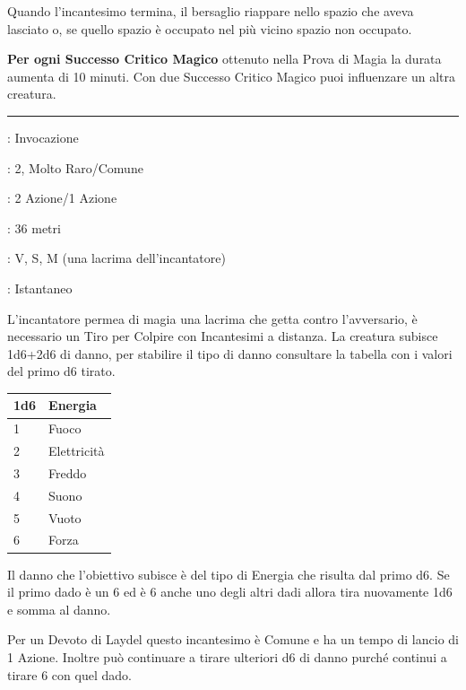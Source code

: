 \begin{multicols}{2}
Quando l'incantesimo termina, il bersaglio riappare nello spazio che aveva lasciato o, se quello spazio è occupato nel più vicino spazio non occupato.

\textbf{Per ogni Successo Critico Magico} ottenuto nella Prova di Magia la durata aumenta di 10 minuti. Con due Successo Critico Magico puoi influenzare un altra creatura.

\smallskip\noindent\rule{\linewidth}{2pt} \hypertarget{Lacrima di Laydel}{}\smallskip{}
\noindent
\begin{description}[noitemsep, topsep=0pt, parsep=0pt, partopsep=0pt, leftmargin=0cm, labelwidth=2.8cm]
	\item[\textbf{Lista di Magia}]: Invocazione
	\item[\textbf{Livello}]: 2, Molto Raro/Comune
	\item[\textbf{T. di Lancio}]: 2 Azione/1 Azione
	\item[\textbf{Gittata}]: 36 metri
	\item[\textbf{Componenti}]: V, S, M (una lacrima dell'incantatore)
	\item[\textbf{Durata}]: Istantaneo
\end{description}

L'incantatore permea di magia una lacrima che getta contro l'avversario, è necessario un Tiro per Colpire con Incantesimi a distanza.
La creatura subisce 1d6+2d6 di danno, per stabilire il tipo di danno consultare la tabella con i valori del primo d6 tirato.

\medskip

\begin{tabular}{l|l}
	\textbf{1d6}&\textbf{Energia}\\
	\hline
	1 &Fuoco\\
	2 &Elettricità\\
	3 &Freddo\\
	4 &Suono\\
	5 &Vuoto\\
	6 &Forza
\end{tabular}

\medskip

Il danno che l'obiettivo subisce è del tipo di Energia che risulta dal primo d6. Se il primo dado è un 6 ed è 6 anche uno degli altri dadi allora tira nuovamente 1d6 e somma al danno.

Per un Devoto di Laydel questo incantesimo è Comune e ha un tempo di lancio di 1 Azione. Inoltre può continuare a tirare ulteriori d6 di danno purché continui a tirare 6 con quel dado.


\end{multicols}
